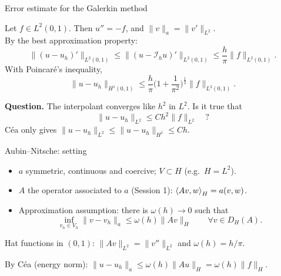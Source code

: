 \begin{frame}{Error estimate for the Galerkin method}
    \begin{example}
        Let $f \in L^2(0,1)$. Then $u'' = -f$, and $\|v\|_a = \|v'\|_{L^2}$.\\ By the best approximation property:
        \[
            \|(u - u_h)'\|_{L^2(0,1)} \le \|(u - \mathcal I_h u)'\|_{L^2(0,1)} \le \frac h \pi \|f\|_{L^2(0,1)}.
        \]
        With Poincaré's inequality,
        \[
            \|u - u_h\|_{H^1(0,1)} \le \frac{h}{\pi}\Big(1 + \frac{1}{\pi^2}\Big)^{\frac 1 2} \|f\|_{L^2(0,1)}.
        \]
    \end{example}
    \bigskip
    \textbf{Question.} The interpolant converges like $h^2$ in $L^2$. Is it true that
    \[
        \|u - u_h\|_{L^2} \le C h^2 \|f\|_{L^2} \quad ?
    \]
    Céa only gives $\|u - u_h\|_{L^2} \le \|u - u_h\|_{H^1} \le C h$.
\end{frame}

\begin{frame}{Aubin--Nitsche: setting}
    \begin{itemize}
        \item $a$ symmetric, continuous and coercive; $V \subset H$ (e.g.\ $H = L^2$).
        \item $A$ the operator associated to $a$ (Session 1): $\left\langle Av, w \right\rangle_H = a(v,w)$.
        \item \alert{Approximation assumption:} there is $\omega(h) \to 0$ such that
              \[
                  \inf_{v_h \in V_h} \|v - v_h\|_a \le \omega(h) \|Av\|_H \qquad \forall v \in D_H(A).
              \]
    \end{itemize}
    \begin{example}
        Hat functions in $(0,1)$: $\|Av\|_{L^2} = \|v''\|_{L^2}$ and $\omega(h) = h/\pi$.
    \end{example}
    By Céa (energy norm): \quad $\|u - u_h\|_a \le \omega(h)\|Au\|_H = \omega(h) \|f\|_H$.
\end{frame}


